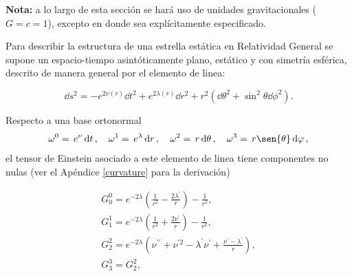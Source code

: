 
\noindent\small{\textbf{Nota:} a lo largo de esta sección se hará uso de unidades gravitacionales ($G=c=1$), excepto en donde sea explícitamente especificado.}
\normalsize

Para describir la estructura de una estrella estática en Relatividad General se supone un espacio-tiempo asintóticamente plano, estático y con simetría esférica, descrito de manera general por el elemento de linea:

\begin{equation}
\dd{s}^ { 2 } = -e ^ { 2 \nu ( r ) } \dd{ t} ^ { 2 } + e ^ { 2 \lambda ( r ) } \dd{ r} ^ { 2 } + r ^ { 2 } \left( \dd{ \theta} ^ { 2 } + \sin ^ { 2 }  \theta  \dd{ \phi} ^ { 2 } \right) .   
\end{equation}

Respecto a una base ortonormal
\begin{equation}
    \omega^0=\,e^{\nu}\dd{t}, \quad
    \omega^1=\,e^{\lambda}\dd{r}, \quad
    \omega^2=\,r\dd{\theta}, \quad
    \omega^3=\,r\sen{\theta}\dd{\varphi},
\end{equation}
el tensor de Einstein asociado a este elemento de linea tiene componentes no nulas (ver el Apéndice \ref{curvature} para la derivación)

\begin{equation}
    \begin{array} { l } { G _ { 0 } ^ { 0 } = e ^ { - 2 \lambda } \left( \frac { 1 } { r ^ { 2 } } - \frac { 2 \lambda ^ { \prime } } { r } \right) - \frac { 1 } { r ^ { 2 } }  }, \\ { G _ { 1 } ^ { 1 } = e ^ { - 2 \lambda } \left( \frac { 1 } { r ^ { 2 } } + \frac { 2 \nu ^ { \prime } } { r } \right) - \frac { 1 } { r ^ { 2 } } }, \\ { G _ { 2 } ^ { 2 } = e ^ { - 2 \lambda } \left( \nu ^ { \prime \prime } + \nu ^ { \prime 2 } - \lambda ^ { \prime } \nu ^ { \prime } + \frac { \nu ^ { \prime } - \lambda ^ { \prime } } { r } \right)  }, \\ { G _ { 3 } ^ { 3 } = G _ { 2 } ^ { 2 }  }, \end{array}
    \label{eee}
\end{equation}


